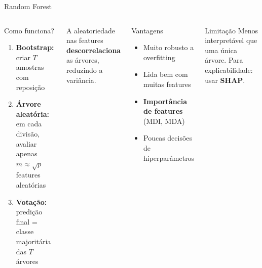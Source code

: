 \documentclass[aspectratio=169]{beamer}
\begin{document}
\begin{frame}{Random Forest}
\begin{columns}[T]
\begin{block}{Como funciona?}
\begin{enumerate}
  \item \textbf{Bootstrap:} criar $T$ amostras com reposição
  \item \textbf{Árvore aleatória:} em cada divisão, avaliar apenas $m \approx \sqrt{p}$ features aleatórias
  \item \textbf{Votação:} predição final = classe majoritária das $T$ árvores
\end{enumerate}
\end{block}
\vspace{0.4em}
A aleatoriedade nas features \textbf{descorrelaciona} as árvores, reduzindo a variância.

\begin{exampleblock}{Vantagens}
\begin{itemize}
  \item Muito robusto a overfitting
  \item Lida bem com muitas features
  \item \textbf{Importância de features} (MDI, MDA)
  \item Poucas decisões de hiperparâmetros
\end{itemize}
\end{exampleblock}
\vspace{0.4em}
\begin{alertblock}{Limitação}
  Menos interpretável que uma única árvore. Para explicabilidade: usar \textbf{SHAP}.
\end{alertblock}
\end{columns}
\end{frame}
\end{document}
